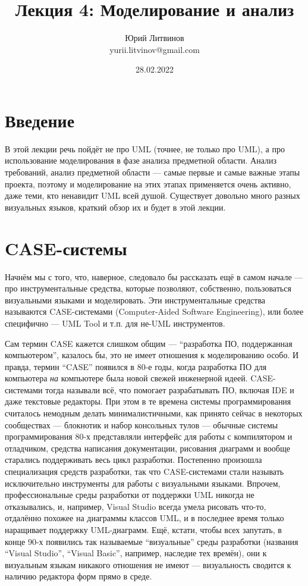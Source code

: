 \documentclass[a5paper]{article}
\title{Лекция 4:  Моделирование и анализ}
\author{Юрий Литвинов\\\small{yurii.litvinov@gmail.com}}
\date{28.02.2022}
\begin{document}
\maketitle
\thispagestyle{empty}

\section{Введение}

В этой лекции речь пойдёт не про UML (точнее, не только про UML), а про использование моделирования в фазе анализа предметной области. Анализ требований, анализ предметной области --- самые первые и самые важные этапы проекта, поэтому и моделирование на этих этапах применяется очень активно, даже теми, кто ненавидит UML всей душой. Существует довольно много разных визуальных языков, краткий обзор их и будет в этой лекции.

\section{CASE-системы}

Начнём мы с того, что, наверное, следовало бы рассказать ещё в самом начале --- про инструментальные средства, которые позволяют, собственно, пользоваться визуальными языками и моделировать. Эти инструментальные средства называются CASE-системами (Computer-Aided Software Engineering), или более специфично --- UML Tool и т.п. для не-UML инструментов. 

Сам термин CASE кажется слишком общим --- ``разработка ПО, поддержанная компьютером'', казалось бы, это не имеет отношения к моделированию особо. И правда, термин ``CASE'' появился в 80-е годы, когда разработка ПО для компьютера \textit{на} компьютере была новой свежей инженерной идеей. CASE-системами тогда называли всё, что помогает разрабатывать ПО, включая IDE и даже текстовые редакторы. При этом в те времена системы программирования считалось немодным делать минималистичными, как принято сейчас в некоторых сообществах --- блокнотик и набор консольных тулов --- обычные системы программирования 80-х представляли интерфейс для работы с компилятором и отладчиком, средства написания документации, рисования диаграмм и вообще старались поддерживать весь цикл разработки. Постепенно произошла специализация средств разработки, так что CASE-системами стали называть исключительно инструменты для работы с визуальными языками. Впрочем, профессиональные среды разработки от поддержки UML никогда не отказывались, и, например, Visual Studio всегда умела рисовать что-то, отдалённо похожее на диаграммы классов UML, и в последнее время только наращивает поддержку UML-диаграмм. Ещё, кстати, чтобы всех запутать, в конце 90-х появились так называемые ``визуальные'' среды разработки (названия ``Visual Studio'', ``Visual Basic'', например, наследие тех времён), они к визуальным языкам никакого отношения не имеют --- визуальность сводится к наличию редактора форм прямо в среде.
\end{document}
